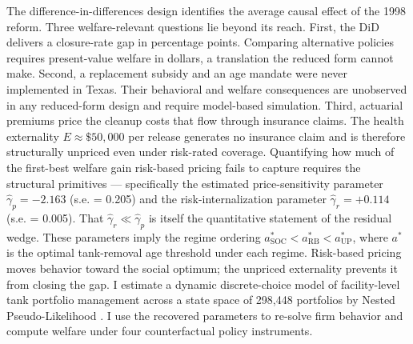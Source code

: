 \documentclass[
  12pt,
]{article}
\begin{document}
The difference-in-differences design identifies the average causal
effect of the 1998 reform. Three welfare-relevant questions lie beyond
its reach. First, the DiD delivers a closure-rate gap in percentage
points. Comparing alternative policies requires present-value welfare in
dollars, a translation the reduced form cannot make. Second, a
replacement subsidy and an age mandate were never implemented in Texas.
Their behavioral and welfare consequences are unobserved in any
reduced-form design and require model-based simulation. Third, actuarial
premiums price the cleanup costs that flow through insurance claims. The
health externality \(E \approx \$50{,}000\) per release generates no
insurance claim and is therefore structurally unpriced even under
risk-rated coverage. Quantifying how much of the first-best welfare gain
risk-based pricing fails to capture requires the structural primitives
--- specifically the estimated price-sensitivity parameter
\(\hat{\gamma}_p = -2.163\) (s.e. = 0.205) and the risk-internalization
parameter \(\hat{\gamma}_r = +0.114\) (s.e. = 0.005). That
\(\hat{\gamma}_r \ll \hat{\gamma}_p\) is itself the quantitative
statement of the residual wedge. These parameters imply the regime
ordering \(a^*_{\text{SOC}} < a^*_{\text{RB}} < a^*_{\text{UP}}\), where
\(a^*\) is the optimal tank-removal age threshold under each regime.
Risk-based pricing moves behavior toward the social optimum; the
unpriced externality prevents it from closing the gap. I estimate a
dynamic discrete-choice model of facility-level tank portfolio
management across a state space of 298,448 portfolios by Nested
Pseudo-Likelihood \citep{aguirregabiria2007}. I use the recovered
parameters to re-solve firm behavior and compute welfare under four
counterfactual policy instruments.
\end{document}
